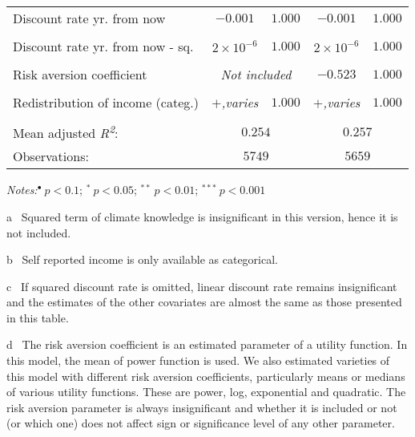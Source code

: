 \documentclass[a4paper,12pt]{article}
\begin{document}
{\begin{threeparttable}
\begin{small}
\begin{tabular}{lcccc}
    \\ \vspace{-0.33cm}Discount rate yr. from now&$-0.001$&$1.000$&$-0.001$&$1.000$\\  
      \\
 \vspace{-0.33cm}Discount rate yr. from now - sq.\tnote{c}&\multirow{1}{*}{$2\times10^{-6}$}&\multirow{1}{*}{$1.000$}&\multirow{1}{*}{$2\times10^{-6}$}&\multirow{1}{*}{$1.000$}\\
  \\  \vspace{-0.33cm}Risk aversion coefficient\tnote{d}&\multicolumn{2}{c}{\textit{Not included}}&$-0.523$&$1.000$\\          
   \\
  \vspace{-0.35cm}Redistribution of income (categ.)\tnote{e}&\textit{$+$,varies}&$1.000$&\textit{$+$,varies}&$1.000$\\%
    \\
     \hline
          Mean adjusted \textit{R\textsuperscript2}:&\multicolumn{2}{c}{$0.254$}&\multicolumn{2}{c}{$0.257$}\\
  Observations: &\multicolumn{2}{c}{$5749$}&\multicolumn{2}{c}{$5659$}
\\
\hline
\end{tabular} 
\end{small}
 \begin{tablenotes}
  \begin{footnotesize}
 \item \textit{Notes:}\hspace{0.2cm}$^{\bullet}~p<0.1$; $^{*}~p<0.05$; $^{**}~p<0.01$; $^{***}~p<0.001$
 \begin{adjustwidth}{0.9cm}{}
  \vspace{-0.3cm}
 \item[a]~Squared term of climate knowledge is insignificant in this version, hence it is not included.
\item[b]~Self reported income is only available as categorical.
\item[c]~If squared discount rate is omitted, linear discount rate remains insignificant and the estimates of the other covariates are almost the same as those presented in this table.
\item[d]~The risk aversion coefficient is an estimated parameter of a utility function. In this model, the mean of power function is used. We also estimated varieties of this model with different risk aversion coefficients, particularly means or medians of various utility functions. These are power, log, exponential and quadratic. The risk aversion parameter is always insignificant and whether it is included or not (or which one) does not affect sign or significance level of any other parameter. 

\end{adjustwidth}
\end{footnotesize}
\end{tablenotes}
\end{threeparttable}}
\end{document}
